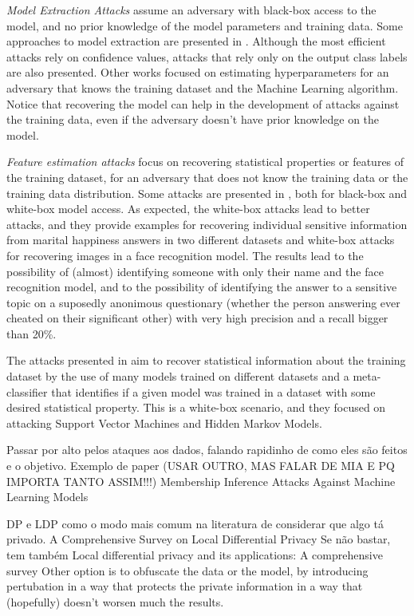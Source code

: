\emph{Model Extraction Attacks} assume an adversary with black-box access to the model, and no prior knowledge of the model parameters and training data. Some approaches to model extraction are presented in \cite{tramer2016stealing}. Although the most efficient attacks rely on confidence values, attacks that rely only on the output class labels are also presented. Other works focused on estimating hyperparameters \cite{wang2018stealing} for an adversary that knows the training dataset and the Machine Learning algorithm. Notice that recovering the model can help in the development of attacks against the training data, even if the adversary doesn't have prior knowledge on the model.

\emph{Feature estimation attacks} focus on recovering statistical properties or features of the training dataset, for an adversary that does not know the training data or the training data distribution. Some attacks are presented in \cite{fredrikson2015model}, both for black-box and white-box model access. As expected, the white-box attacks lead to better attacks, and they provide examples for recovering individual sensitive information from marital happiness answers in two different datasets and white-box attacks for recovering images in a face recognition model. The results lead to the possibility of (almost) identifying someone with only their name and the face recognition model, and to the possibility of identifying the answer to a sensitive topic on a suposedly anonimous questionary (whether the person answering ever cheated on their significant other) with very high precision and a recall bigger than 20\%. 

The attacks presented in \cite{ateniese2015hacking} aim to recover statistical information about the training dataset by the use of many models trained on different datasets and a meta-classifier that identifies if a given model was trained in a dataset with some desired statistical property. This is a white-box scenario, and they focused on attacking Support Vector Machines and Hidden Markov Models.



{\color{red} Passar por alto pelos ataques aos dados, falando rapidinho de como eles são feitos e o objetivo. Exemplo de paper (USAR OUTRO, MAS FALAR DE MIA E PQ IMPORTA TANTO ASSIM!!!) Membership Inference Attacks Against Machine Learning Models}

{\color{red} DP e LDP como o modo mais comum na literatura de considerar que algo tá privado. A Comprehensive Survey on Local Differential Privacy Se não bastar, tem também Local differential privacy and its applications: A comprehensive survey}
Other option is to obfuscate the data or the model, by introducing pertubation in a way that protects the private information in a way that (hopefully) doesn't worsen much the results.


